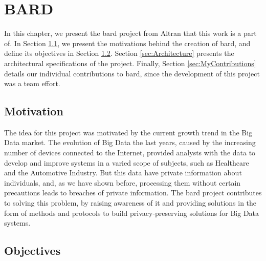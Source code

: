%

\acresetall

\chapter{BARD}
\label{ch:BARD}


In this chapter, we present the \ac{bard} project from Altran that this work is a part of. 
In Section \ref{sec:Motivation}, we present the motivations behind the creation of \ac{bard}, and define its objectives in Section \ref{sec:Objectives}.
Section \ref{sec:Architecture} presents the architectural specifications of the project.
Finally, Section \ref{sec:MyContributions} details our individual contributions to \ac{bard}, since the development of this project was a team effort.



\section{Motivation}
\label{sec:Motivation}

The idea for this project was motivated by the current growth trend in the Big Data market. The evolution of Big Data the last years, caused by the increasing number of devices connected to the Internet, provided analysts with the data to develop and improve systems in a varied scope of subjects, such as Healthcare and the Automotive Industry. But this data have private information about individuals, and, as we have shown before, processing them without certain precautions leads to breaches of private information. The \ac{bard} project contributes to solving this problem, by raising awareness of it and providing solutions in the form of methods and protocols to build privacy-preserving solutions for Big Data systems.

\section{Objectives}
\label{sec:Objectives}

